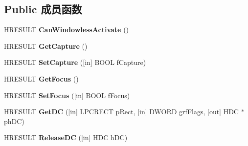 \subsection*{Public 成员函数}
\begin{DoxyCompactItemize}
\item 
\mbox{\label{interface_i_ole_in_place_site_windowless_aa492da622f6e099fe725108dfd2405d8}} 
H\+R\+E\+S\+U\+LT {\bfseries Can\+Windowless\+Activate} ()
\item 
\mbox{\label{interface_i_ole_in_place_site_windowless_a3b4e5d9b0397efa08cc5a033cd587f9d}} 
H\+R\+E\+S\+U\+LT {\bfseries Get\+Capture} ()
\item 
\mbox{\label{interface_i_ole_in_place_site_windowless_a70431a9ed8869b2128c2556c0b6eb9c3}} 
H\+R\+E\+S\+U\+LT {\bfseries Set\+Capture} (\mbox{[}in\mbox{]} B\+O\+OL f\+Capture)
\item 
\mbox{\label{interface_i_ole_in_place_site_windowless_a3e1c619b631ba13650ff6191d806dd28}} 
H\+R\+E\+S\+U\+LT {\bfseries Get\+Focus} ()
\item 
\mbox{\label{interface_i_ole_in_place_site_windowless_a962f83b21eff84928752d83431f0b15d}} 
H\+R\+E\+S\+U\+LT {\bfseries Set\+Focus} (\mbox{[}in\mbox{]} B\+O\+OL f\+Focus)
\item 
\mbox{\label{interface_i_ole_in_place_site_windowless_ad69906f1e2845d62032f6e736b199a04}} 
H\+R\+E\+S\+U\+LT {\bfseries Get\+DC} (\mbox{[}in\mbox{]} \hyperlink{structtag_r_e_c_t}{L\+P\+C\+R\+E\+CT} p\+Rect, \mbox{[}in\mbox{]} D\+W\+O\+RD grf\+Flags, \mbox{[}out\mbox{]} H\+DC $\ast$ph\+DC)
\item 
\mbox{\label{interface_i_ole_in_place_site_windowless_a24b8fad9c506cf40561e00bf6ec5f75c}} 
H\+R\+E\+S\+U\+LT {\bfseries Release\+DC} (\mbox{[}in\mbox{]} H\+DC h\+DC)
\item 
\mbox{\label{interface_i_ole_in_place_site_windowless_ac3ed2a1293652ea758e18321ed57fc19}} 

\end{DoxyCompactItemize}
